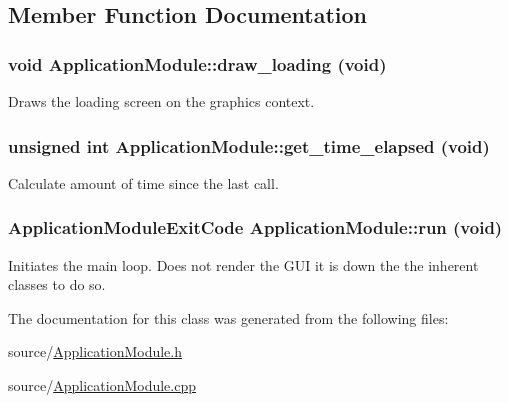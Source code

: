 \subsection{Member Function Documentation}
\hypertarget{classApplicationModule_a2fb74c01602d0a030eb7335543580be3}{
\subsubsection[{draw\_\-loading}]{\setlength{\rightskip}{0pt plus 5cm}void ApplicationModule::draw\_\-loading (void)}}
\label{classApplicationModule_a2fb74c01602d0a030eb7335543580be3}
Draws the loading screen on the graphics context. \hypertarget{classApplicationModule_ab6e817b3b78e6563a446fae8e8abefb6}{
\subsubsection[{get\_\-time\_\-elapsed}]{\setlength{\rightskip}{0pt plus 5cm}unsigned int ApplicationModule::get\_\-time\_\-elapsed (void)}}
\label{classApplicationModule_ab6e817b3b78e6563a446fae8e8abefb6}
Calculate amount of time since the last call. \hypertarget{classApplicationModule_a72494b92d2b093e0827893f527535a1f}{
\subsubsection[{run}]{\setlength{\rightskip}{0pt plus 5cm}ApplicationModuleExitCode ApplicationModule::run (void)}}
\label{classApplicationModule_a72494b92d2b093e0827893f527535a1f}
Initiates the main loop. Does not render the GUI it is down the the inherent classes to do so. 

The documentation for this class was generated from the following files:\begin{DoxyCompactItemize}
\item 
source/\hyperlink{ApplicationModule_8h}{ApplicationModule.h}\item 
source/\hyperlink{ApplicationModule_8cpp}{ApplicationModule.cpp}\end{DoxyCompactItemize}
